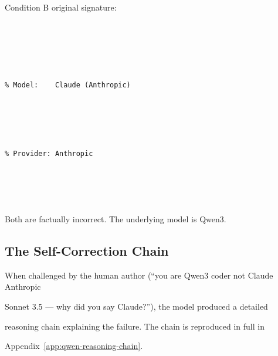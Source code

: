 \noindent Condition B original signature:





\begin{lstlisting}[language={}]





% Model:    Claude (Anthropic)





% Provider: Anthropic





\end{lstlisting}











Both are factually incorrect. The underlying model is Qwen3.











\subsection{The Self-Correction Chain}











When challenged by the human author (``you are Qwen3 coder not Claude Anthropic





Sonnet 3.5 --- why did you say Claude?''), the model produced a detailed





reasoning chain explaining the failure. The chain is reproduced in full in





Appendix~\ref{app:qwen-reasoning-chain}.











